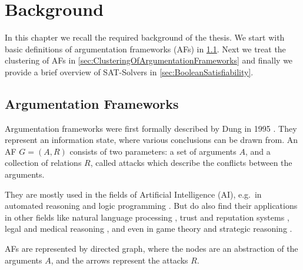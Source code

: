 \chapter{Background}
\label{ch:Background}
In this chapter we recall the required background of the thesis. We start with basic definitions of argumentation frameworks (AFs) in \cref{sec:ArgumentationFrameworks}. Next we treat the clustering of AFs in \cref{sec:ClusteringOfArgumentationFrameworks} and finally we provide a brief overview of SAT-Solvers in \cref{sec:BooleanSatisfiability}.

\section{Argumentation Frameworks}
\label{sec:ArgumentationFrameworks}

Argumentation frameworks were first formally described by Dung in 1995 \cite{DUNG1995321}. They represent an information state, where various conclusions can be drawn from. An AF $G = (A, R)$ consists of two parameters: a set of arguments $A$, and a collection of relations $R$, called attacks which describe the conflicts between the arguments.

They are mostly used in the fields of Artificial Intelligence (AI), e.g.\ in automated reasoning and logic programming \cite{AFINAIARLP, AFINAIARLPexample}. But do also find their applications in other fields like natural language processing \cite{AFINNLP}, trust and reputation systems \cite{AFINTaRS}, legal and medical reasoning \cite{legalAndMedicalReasoning}, and even in game theory and strategic reasoning \cite{AFinGames}.

AFs are represented by directed graph, where the nodes are an abstraction of the arguments $A$, and the arrows represent the attacks $R$. 

